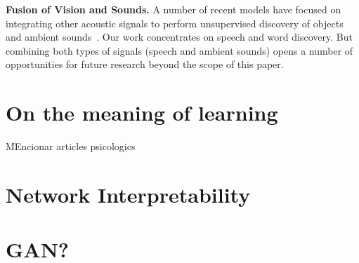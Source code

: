 \textbf{Fusion of Vision and Sounds.} 
A number of recent models have focused on integrating other acoustic signals to perform unsupervised discovery of objects and ambient sounds~\cite{Owens16,Owens2016b,NIPS2016_6146,look_listen_learn}. Our work concentrates on speech and word discovery. But combining both types of signals (speech and ambient sounds) opens a number of opportunities for future research beyond the scope of this paper.

\section{On the meaning of learning}
MEncionar articles psicologics

\section{Network Interpretability}

\section{GAN?}

